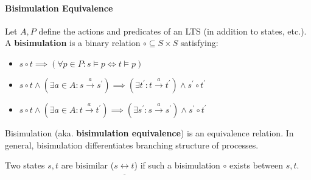 \documentclass[99-notes-packed.tex]{subfiles}
\begin{document}
\paragraph*{Bisimulation Equivalence}
\begin{definition}[bisimulation]
    Let $A, P$ define the actions and predicates of an LTS (in addition to states, etc.). A \textbf{bisimulation} is a binary relation $\circ \subseteq S \times S$ satisfying: 
    \begin{itemize}
        \item $
            s \circ t \implies 
            (\forall p \in P: s \models p \iff t \models p)
        $
        \item $
            s \circ t \wedge (\exists a \in A: s \xrightarrow{a} s^{'}) \implies
            (\exists t^{'}: t \xrightarrow{a} t^{'}) \wedge s^{'} \circ t^{'}
        $
        \item $
            s \circ t \wedge (\exists a \in A: t \xrightarrow{a} t^{'}) \implies
            (\exists s^{'}: s \xrightarrow{a} s^{'}) \wedge s^{'} \circ t^{'}
        $
    \end{itemize}

    Bisimulation (aka. \textbf{bisimulation equivalence}) is an equivalence relation. In general, bisimulation differentiates branching structure of processes.  
\end{definition}

\begin{definition}[bisimilarity]
    Two states $s, t$ are bisimilar ($s \underline{\leftrightarrow} t$) if such a bisimulation $\circ$ exists between $s, t$.
\end{definition}
\end{document}

